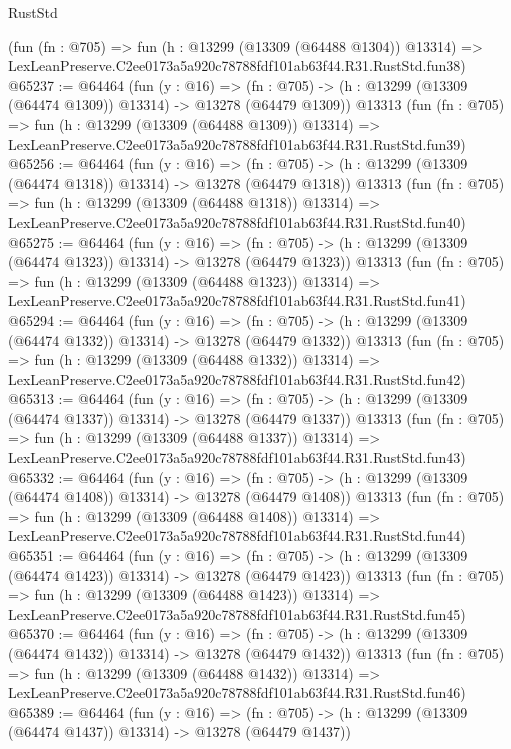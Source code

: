 \begin{lexlean}{RustStd}
\begin{coremodule}
    (fun (fn : @705) =>
    fun (h : @13299 (@13309 (@64488 @1304)) @13314) =>
    LexLeanPreserve.C2ee0173a5a920c78788fdf101ab63f44.R31.RustStd.fun38)
@65237 := @64464
    (fun (y : @16) =>
    (fn : @705) -> (h : @13299 (@13309 (@64474 @1309)) @13314) -> @13278 (@64479 @1309))
    @13313
    (fun (fn : @705) =>
    fun (h : @13299 (@13309 (@64488 @1309)) @13314) =>
    LexLeanPreserve.C2ee0173a5a920c78788fdf101ab63f44.R31.RustStd.fun39)
@65256 := @64464
    (fun (y : @16) =>
    (fn : @705) -> (h : @13299 (@13309 (@64474 @1318)) @13314) -> @13278 (@64479 @1318))
    @13313
    (fun (fn : @705) =>
    fun (h : @13299 (@13309 (@64488 @1318)) @13314) =>
    LexLeanPreserve.C2ee0173a5a920c78788fdf101ab63f44.R31.RustStd.fun40)
@65275 := @64464
    (fun (y : @16) =>
    (fn : @705) -> (h : @13299 (@13309 (@64474 @1323)) @13314) -> @13278 (@64479 @1323))
    @13313
    (fun (fn : @705) =>
    fun (h : @13299 (@13309 (@64488 @1323)) @13314) =>
    LexLeanPreserve.C2ee0173a5a920c78788fdf101ab63f44.R31.RustStd.fun41)
@65294 := @64464
    (fun (y : @16) =>
    (fn : @705) -> (h : @13299 (@13309 (@64474 @1332)) @13314) -> @13278 (@64479 @1332))
    @13313
    (fun (fn : @705) =>
    fun (h : @13299 (@13309 (@64488 @1332)) @13314) =>
    LexLeanPreserve.C2ee0173a5a920c78788fdf101ab63f44.R31.RustStd.fun42)
@65313 := @64464
    (fun (y : @16) =>
    (fn : @705) -> (h : @13299 (@13309 (@64474 @1337)) @13314) -> @13278 (@64479 @1337))
    @13313
    (fun (fn : @705) =>
    fun (h : @13299 (@13309 (@64488 @1337)) @13314) =>
    LexLeanPreserve.C2ee0173a5a920c78788fdf101ab63f44.R31.RustStd.fun43)
@65332 := @64464
    (fun (y : @16) =>
    (fn : @705) -> (h : @13299 (@13309 (@64474 @1408)) @13314) -> @13278 (@64479 @1408))
    @13313
    (fun (fn : @705) =>
    fun (h : @13299 (@13309 (@64488 @1408)) @13314) =>
    LexLeanPreserve.C2ee0173a5a920c78788fdf101ab63f44.R31.RustStd.fun44)
@65351 := @64464
    (fun (y : @16) =>
    (fn : @705) -> (h : @13299 (@13309 (@64474 @1423)) @13314) -> @13278 (@64479 @1423))
    @13313
    (fun (fn : @705) =>
    fun (h : @13299 (@13309 (@64488 @1423)) @13314) =>
    LexLeanPreserve.C2ee0173a5a920c78788fdf101ab63f44.R31.RustStd.fun45)
@65370 := @64464
    (fun (y : @16) =>
    (fn : @705) -> (h : @13299 (@13309 (@64474 @1432)) @13314) -> @13278 (@64479 @1432))
    @13313
    (fun (fn : @705) =>
    fun (h : @13299 (@13309 (@64488 @1432)) @13314) =>
    LexLeanPreserve.C2ee0173a5a920c78788fdf101ab63f44.R31.RustStd.fun46)
@65389 := @64464
    (fun (y : @16) =>
    (fn : @705) -> (h : @13299 (@13309 (@64474 @1437)) @13314) -> @13278 (@64479 @1437))

\end{coremodule}
\end{lexlean}
